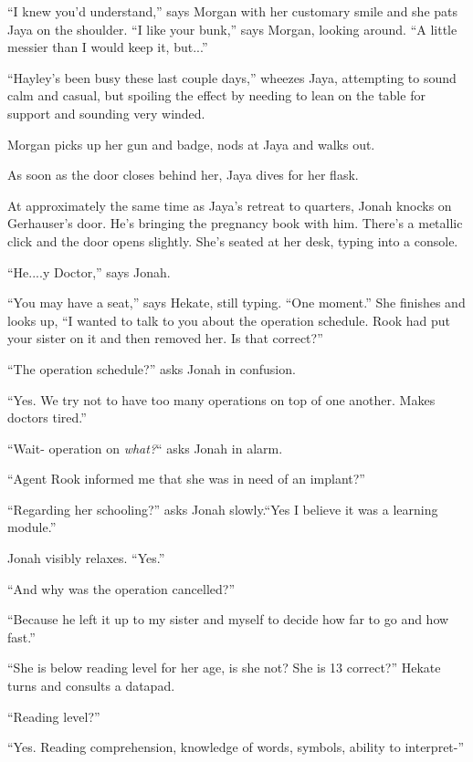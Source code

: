 ``I knew you'd understand,'' says Morgan with her customary smile and she pats Jaya on the shoulder.  ``I like your bunk,'' says Morgan, looking around.  ``A little messier than I would keep it, but...''

``Hayley's been busy these last couple days,'' wheezes Jaya, attempting to sound calm and casual, but spoiling the effect by needing to lean on the table for support and sounding very winded.

Morgan picks up her gun and badge, nods at Jaya and walks out.

As soon as the door closes behind her, Jaya dives for her flask.





At approximately the same time as Jaya's retreat to quarters, Jonah knocks on Gerhauser's door.  He's bringing the pregnancy book with him.  There's a metallic click and the door opens slightly.  She's seated at her desk, typing into a console.  

``He....y Doctor,'' says Jonah.

``You may have a seat,'' says Hekate, still typing.  ``One moment.''  She finishes and looks up, ``I wanted to talk to you about the operation schedule.  Rook had put your sister on it and then removed her. Is that correct?''

``The operation schedule?'' asks Jonah in confusion.

``Yes.  We try not to have too many operations on top of one another.  Makes doctors tired.''

``Wait- operation on \textit{what?}`` asks Jonah in alarm.

``Agent Rook informed me that she was in need of an implant?''

``Regarding her schooling?'' asks Jonah slowly.``Yes I believe it was a learning module.''

Jonah visibly relaxes.  ``Yes.''

``And why was the operation cancelled?''

``Because he left it up to my sister and myself to decide how far to go and how fast.''

``She is below reading level for her age, is she not?  She is 13 correct?'' Hekate turns and consults a datapad.

``Reading level?''

``Yes.  Reading comprehension, knowledge of words, symbols, ability to interpret-''

